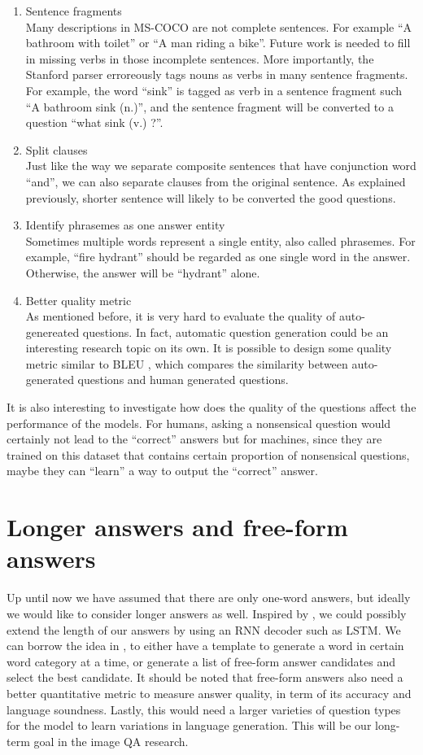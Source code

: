 \begin{enumerate}
\item Sentence fragments\\
Many descriptions in MS-COCO are not complete sentences. For example ``A bathroom with toilet'' or ``A man riding a bike''. Future work is needed to fill in missing verbs in those incomplete sentences. More importantly, the Stanford parser erroreously tags nouns as verbs in many sentence fragments. For example, the word ``sink'' is tagged as verb in a sentence fragment such ``A bathroom sink (n.)'', and the sentence fragment will be converted to a question ``what sink (v.) ?''.
\item Split clauses\\
Just like the way we separate composite sentences that have conjunction word ``and'', we can also separate clauses from the original sentence. As explained previously, shorter sentence will likely to be converted the good questions.
\item Identify phrasemes as one answer entity\\
Sometimes multiple words represent a single entity, also called phrasemes. For example, ``fire hydrant'' should be regarded as one single word in the answer. Otherwise, the answer will be ``hydrant'' alone.
\item Better quality metric\\
As mentioned before, it is very hard to evaluate the quality of auto-genereated questions. In fact, automatic question generation could be an interesting research topic on its own. It is possible to design some quality metric similar to BLEU \cite{bleu}, which compares the similarity between auto-generated questions and human generated questions.
\end{enumerate}
It is also interesting to investigate how does the quality of the questions affect the performance of the models. For humans, asking a nonsensical question would certainly not lead to the ``correct'' answers but for machines, since they are trained on this dataset that contains certain proportion of nonsensical questions, maybe they can ``learn'' a way to output the ``correct'' answer.

\section{Longer answers and free-form answers}
Up until now we have assumed that there are only one-word answers, but ideally we would like to consider longer answers as well. Inspired by \cite{sutskever14}, we could possibly extend the length of our answers by using an RNN decoder such as LSTM. We can borrow the idea in \cite{kiros14b}, to either have a template to generate a word in certain word category at a time, or generate a list of free-form answer candidates and select the best candidate. It should be noted that free-form answers also need a better quantitative metric to measure answer quality, in term of its accuracy and language soundness. Lastly, this would need a larger varieties of question types for the model to learn variations in language generation. This will be our long-term goal in the image QA research.
